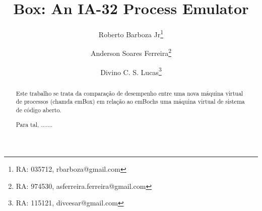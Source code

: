 \documentclass[11pt,twoside]{article}
\begin{document}
% 

%



\TRMakeCover


%
\pagestyle{myheadings}

%
\title{Box: An IA-32 Process Emulator}

\author{Roberto Barboza Jr\thanks{RA: 035712, rbarboza@gmail.com} \and
Anderson Soares Ferreira\thanks{RA: 974530, asferreira.ferreira@gmail.com} \and
Divino C. S. Lucas\thanks{RA: 115121, divcesar@gmail.com}}

\date{}

\maketitle


\begin{abstract} 
  Este trabalho se trata da comparação de desempenho entre uma nova máquina 
  virtual de processos (chamda em{Box}) em relação ao em{Bochs} uma máquina
  virtual de sistema de código aberto.

  Para tal, .......
  
\end{abstract}
\end{document}
